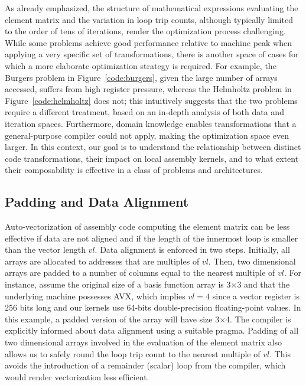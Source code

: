 \documentclass[conference]{IEEEtran}
\begin{document}
As already emphasized, the structure of mathematical expressions evaluating the element matrix and the variation in loop trip counts, although typically limited to the order of tens of iterations, render the optimization process challenging. While some problems achieve good performance relative to machine peak when applying a very specific set of transformations, there is another space of cases for which a more elaborate optimization strategy is required. For example, the Burgers problem in Figure~\ref{code:burgers}, given the large number of arrays accessed, suffers from high register pressure, whereas the Helmholtz problem in Figure~\ref{code:helmholtz} does not; this intuitively suggests that the two problems require a different treatment, based on an in-depth analysis of both data and iteration spaces. Furthermore, domain knowledge enables transformations that a general-purpose compiler could not apply, making the optimization space even larger. In this context, our goal is to understand the relationship between distinct code transformations, their impact on local assembly kernels, and to what extent their composability is effective in a class of problems and architectures.


\subsection{Padding and Data Alignment}
Auto-vectorization of assembly code computing the element matrix can be less effective if data are not aligned and if the length of the innermost loop is smaller than the vector length $vl$. Data alignment is enforced in two steps. Initially, all arrays are allocated to addresses that are multiples of $vl$. Then, two dimensional arrays are padded to a number of columns equal to the nearest multiple of $vl$. For instance, assume the original size of a basis function array is 3$\times$3 and that the underlying machine possesses AVX, which implies $vl=4$ since a vector register is 256 bits long and our kernels use 64-bits double-precision floating-point values. In this example, a padded version of the array will have size 3$\times$4. The compiler is explicitly informed about data alignment using a suitable pragma. Padding of all two dimensional arrays involved in the evaluation of the element matrix also allows us to safely round the loop trip count to the nearest multiple of $vl$. This avoids the introduction of a remainder (scalar) loop from the compiler, which would render vectorization less efficient.
\end{document}
